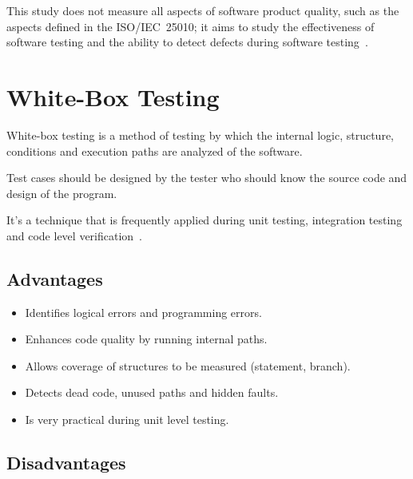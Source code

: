 \documentclass[conference]{IEEEtran}
\begin{document}
This study does not measure all aspects of software product quality, such as the aspects defined in the ISO/IEC~25010; it aims to study the effectiveness of software testing and the ability to detect defects during software testing~\cite{iso25010}.






\section{White-Box Testing}

\label{sec:whitebox}



White-box testing is a method of testing by which the internal logic, structure, conditions and execution paths are analyzed of the software.

Test cases should be designed by the tester who should know the source code and design of the program.


It's a technique that is frequently applied during unit testing, integration testing and code level verification~\cite{nidhra2012,kumar2015}.



\subsection{Advantages}

\begin{itemize}

\item Identifies logical errors and programming errors.

\item Enhances code quality by running internal paths.

\item Allows coverage of structures to be measured (statement, branch).

\item Detects dead code, unused paths and hidden faults.

\item Is very practical during unit level testing.

\end{itemize}



\subsection{Disadvantages}
\end{document}
